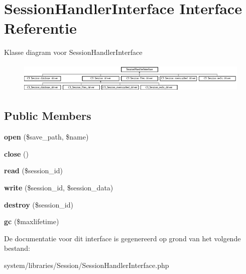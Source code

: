 \hypertarget{interface_session_handler_interface}{}\section{Session\+Handler\+Interface Interface Referentie}
\label{interface_session_handler_interface}
Klasse diagram voor Session\+Handler\+Interface\begin{figure}[H]
\begin{center}
\leavevmode
\includegraphics[height=1.414141cm]{interface_session_handler_interface}
\end{center}
\end{figure}
\subsection*{Public Members}
\begin{DoxyCompactItemize}
\item 
\mbox{\label{interface_session_handler_interface_a614b5cf3840833913c7a73260ed28e02}} 
{\bfseries open} (\$save\+\_\+path, \$name)
\item 
\mbox{\label{interface_session_handler_interface_aa69c8bf1f1dcf4e72552efff1fe3e87e}} 
{\bfseries close} ()
\item 
\mbox{\label{interface_session_handler_interface_a5bbf84ebf657be4eaccc0582377c76bf}} 
{\bfseries read} (\$session\+\_\+id)
\item 
\mbox{\label{interface_session_handler_interface_ad9d124885be93668f1dbf6aace5964f5}} 
{\bfseries write} (\$session\+\_\+id, \$session\+\_\+data)
\item 
\mbox{\label{interface_session_handler_interface_aaec5812f6b4eb6835f88d3baa06a002a}} 
{\bfseries destroy} (\$session\+\_\+id)
\item 
\mbox{\label{interface_session_handler_interface_a57aff7ee0656d8aa75d545fb8b3ae35d}} 
{\bfseries gc} (\$maxlifetime)
\end{DoxyCompactItemize}


De documentatie voor dit interface is gegenereerd op grond van het volgende bestand\+:\begin{DoxyCompactItemize}
\item 
system/libraries/\+Session/Session\+Handler\+Interface.\+php\end{DoxyCompactItemize}
